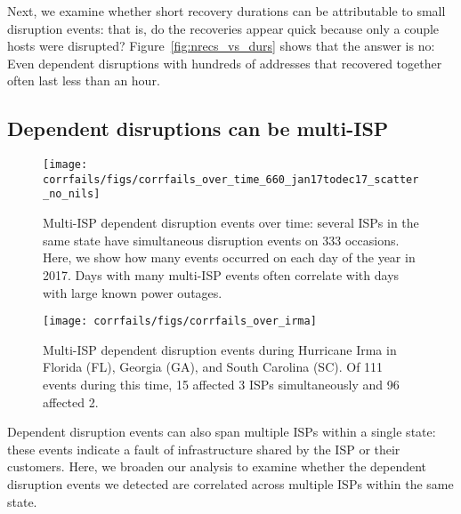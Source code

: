 Next, we examine whether short recovery durations can be attributable
to small disruption events: that is, do the recoveries appear quick
because only a couple hosts were disrupted?
%
Figure~\ref{fig:nrecs_vs_durs} shows that the answer is no: Even
dependent disruptions with hundreds of addresses that recovered
together often last less than an hour.

\subsection{Dependent disruptions can be multi-ISP}

\begin{figure}[t]
\centering
\texttt{[image: corrfails/figs/corrfails\_over\_time\_660\_jan17todec17\_scatter\_no\_nils]}
\caption{
\label{fig:multiisp_over_time}
Multi-ISP dependent disruption events over time: several ISPs in the same
state have simultaneous disruption events on 333 occasions. Here, we
show how many events occurred on each day of the year in 2017. Days
with many multi-ISP events often correlate with days with large known power outages.}
\end{figure}

\begin{figure}[t]
\centering
\texttt{[image: corrfails/figs/corrfails\_over\_irma]}
\caption{
\label{fig:corrfails_over_irma}
Multi-ISP dependent disruption events during Hurricane Irma in Florida (FL), Georgia (GA),
and South Carolina (SC). Of 111 events during this time, 15 affected 3
ISPs simultaneously and 96 affected 2.}
\end{figure}

Dependent disruption events can also span multiple ISPs within a
single state: these events indicate a fault of infrastructure shared
by the ISP or their customers. 
%
Here, we broaden our analysis to examine whether the dependent
disruption events we detected are
correlated across multiple ISPs within the same state.

